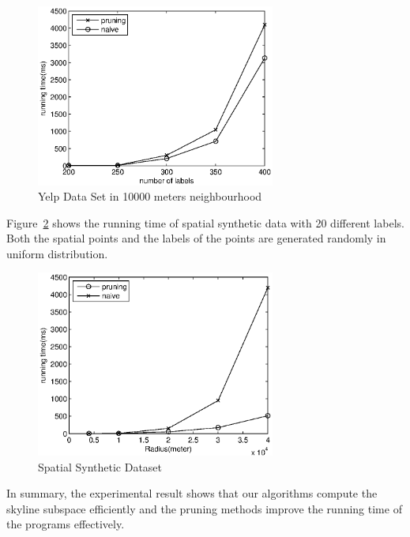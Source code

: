 \begin{figure}[h]
    \centering
      \includegraphics[width=0.7\textwidth]{figs/Yelp10Kmeters}
    \caption{Yelp Data Set in 10000 meters neighbourhood}
    \label{fig:exp:yelp10k}
\end{figure}

Figure~\ref{fig:exp:spatial} shows the running time of spatial synthetic data with 20 different labels. Both the spatial points and the labels of the points are generated randomly in uniform distribution.

\begin{figure}[h]
    \centering
        \includegraphics[width=0.7\textwidth]{figs/Spatial}
    \caption{Spatial Synthetic Dataset}
    \label{fig:exp:spatial}
\end{figure}

In summary, the experimental result shows that our algorithms compute the skyline subspace efficiently and the pruning methods improve the running time of the programs effectively.